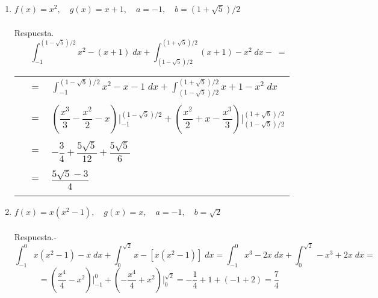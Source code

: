 \begin{enumerate}[\bfseries 1.]
\item $f(x) = x^2, \quad g(x) = x+1, \quad a=-1, \quad b = (1+\sqrt{5})/2$\\\\
    Respuesta.$$\int_{-1}^{(1-\sqrt{5})/2} x^2 - (x+1)\; dx +  \int_{(1-\sqrt{5})/2}^{(1+\sqrt{5})/2} (x+1) - x^2\; dx-\; = $$
    \begin{center}
	\begin{tabular}{rcl}
	     & $=$ & $\displaystyle\int_{-1}^{(1-\sqrt{5})/2} x^2 - x - 1\; dx +  \int_{(1-\sqrt{5})/2}^{(1+\sqrt{5})/2} x + 1 - x^2 \; dx$ \\\\
	    & $=$ & $\left(\dfrac{x^3}{3} - \dfrac{x^2}{2} - x\right)\bigg|_{-1}^{(1-\sqrt{5})/2} + \left(\dfrac{x^2}{2} + x - \dfrac{x^3}{3}\right)\bigg|_{(1-\sqrt{5})/2}^{(1+\sqrt{5})/2}$ \\\\
	    & $=$ & $-\dfrac{3}{4} + \dfrac{5 \sqrt{5}}{12}+\dfrac{5\sqrt{5}}{6}$ \\\\
	    & $=$ & $\dfrac{5\sqrt{5}-3}{4}$\\\\
	\end{tabular}
    \end{center}

\item $f(x)=x(x^2-1),\quad g(x)=x,\quad a=-1, \quad b=\sqrt{2}$\\\\
    Respuesta.-\; $$\int_{-1}^{0} x(x^2-1) - x \; dx + \int_{0}^{\sqrt{2}} x - [x(x^2-1)] \; dx = \int_{-1}^{0} x^3-2x \; dx + \int_{0}^{\sqrt{2}} - x^3 + 2x \; dx = $$
	$$=\left(\dfrac{x^4}{4} - x^2 \right)\bigg|_{-1}^0 + \left( -\dfrac{x^4}{4} + x^2 \right)\bigg|_{0}^{\sqrt{2}} = -\dfrac{1}{4} + 1 + (-1+2) = \dfrac{7}{4}$$\\


\end{enumerate}
